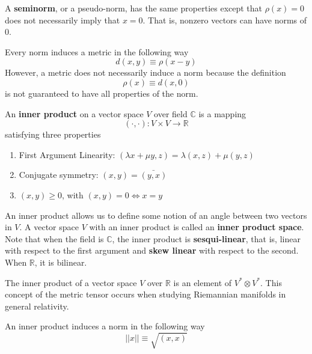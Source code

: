   \begin{definition}[Seminorm]
    A \textbf{seminorm}, or a pseudo-norm, has the same properties except that $\rho(x) = 0$ does not necessarily imply that $x = 0$. That is, nonzero vectors can have norms of $0$. 
  \end{definition}

  \begin{theorem}
    Every norm induces a metric in the following way
    \begin{equation}
      d(x, y) \equiv \rho(x-y)
    \end{equation}
    However, a metric does not necessarily induce a norm because the definition
    \begin{equation}
      \rho(x) \equiv d(x, 0)
    \end{equation}
    is not guaranteed to have all properties of the norm. 
  \end{theorem}

  \begin{definition}
    An \textbf{inner product} on a vector space $V$ over field $\mathbb{C}$ is a mapping 
    \begin{equation}
      (\cdot, \cdot): V \times V \longrightarrow \mathbb{R}
    \end{equation}
    satisfying three properties 
    \begin{enumerate}
      \item First Argument Linearity: $(\lambda x + \mu y, z) = \lambda (x, z) + \mu (y, z)$
      \item Conjugate symmetry: $(x, y) = \bar{(y, x)}$
      \item $(x, y) \geq 0$, with $(x, y) = 0 \iff x = y$
    \end{enumerate}
    An inner product allows us to define some notion of an angle between two vectors in $V$. A vector space $V$ with an inner product is called an \textbf{inner product space}. Note that when the field is $\mathbb{C}$, the inner product is \textbf{sesqui-linear}, that is, linear with respect to the first argument and \textbf{skew linear} with respect to the second. When $\mathbb{R}$, it is bilinear. 
  \end{definition}

  The inner product of a vector space $V$ over $\mathbb{R}$ is an element of $V^* \otimes V^*$. This concept of the metric tensor occurs when studying Riemannian manifolds in general relativity. 

  \begin{definition}
    An inner product induces a norm in the following way
    \begin{equation}
      ||x|| \equiv \sqrt{(x,x)} 
    \end{equation}
  \end{definition}

